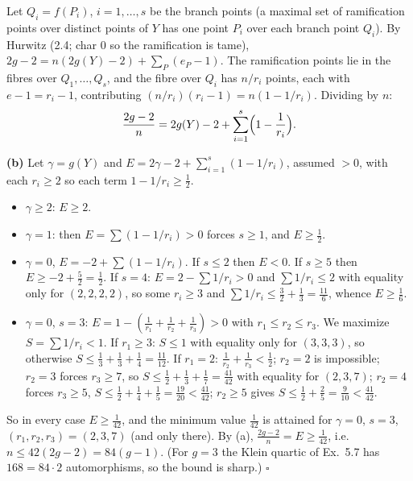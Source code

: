 \documentclass[11pt]{article}
\begin{document}
Let $Q_i=f(P_i)$, $i=1,\dots,s$ be the branch points (a maximal set of ramification points over distinct points of $Y$ has one point $P_i$ over each branch point $Q_i$). By Hurwitz (2.4; char $0$ so the ramification is tame), $2g-2=n(2g(Y)-2)+\sum_P(e_P-1)$. The ramification points lie in the fibres over $Q_1,\dots,Q_s$, and the fibre over $Q_i$ has $n/r_i$ points, each with $e-1=r_i-1$, contributing $(n/r_i)(r_i-1)=n(1-1/r_i)$. Dividing by $n$:
\[
\frac{2g-2}n=2g(Y)-2+\sum_{i=1}^s\Bigl(1-\frac1{r_i}\Bigr).
\]

\textbf{(b)} Let $\gamma=g(Y)$ and $E=2\gamma-2+\sum_{i=1}^s(1-1/r_i)$, assumed $>0$, with each $r_i\ge2$ so each term $1-1/r_i\ge\frac12$.
\begin{itemize}
\item $\gamma\ge2$: $E\ge2$.
\item $\gamma=1$: then $E=\sum(1-1/r_i)>0$ forces $s\ge1$, and $E\ge\frac12$.
\item $\gamma=0$, $E=-2+\sum(1-1/r_i)$. If $s\le2$ then $E<0$. If $s\ge5$ then $E\ge-2+\frac52=\frac12$. If $s=4$: $E=2-\sum1/r_i>0$ and $\sum1/r_i\le2$ with equality only for $(2,2,2,2)$, so some $r_i\ge3$ and $\sum1/r_i\le\frac32+\frac13=\frac{11}6$, whence $E\ge\frac16$.
\item $\gamma=0$, $s=3$: $E=1-(\frac1{r_1}+\frac1{r_2}+\frac1{r_3})>0$ with $r_1\le r_2\le r_3$. We maximize $S=\sum1/r_i<1$. If $r_1\ge3$: $S\le1$ with equality only for $(3,3,3)$, so otherwise $S\le\frac13+\frac13+\frac14=\frac{11}{12}$. If $r_1=2$: $\frac1{r_2}+\frac1{r_3}<\frac12$; $r_2=2$ is impossible; $r_2=3$ forces $r_3\ge7$, so $S\le\frac12+\frac13+\frac17=\frac{41}{42}$ with equality for $(2,3,7)$; $r_2=4$ forces $r_3\ge5$, $S\le\frac12+\frac14+\frac15=\frac{19}{20}<\frac{41}{42}$; $r_2\ge5$ gives $S\le\frac12+\frac25=\frac9{10}<\frac{41}{42}$.
\end{itemize}
So in every case $E\ge\frac1{42}$, and the minimum value $\frac1{42}$ is attained for $\gamma=0$, $s=3$, $(r_1,r_2,r_3)=(2,3,7)$ (and only there). By (a), $\frac{2g-2}n=E\ge\frac1{42}$, i.e.\ $n\le42(2g-2)=84(g-1)$. (For $g=3$ the Klein quartic of Ex.~5.7 has $168=84\cdot2$ automorphisms, so the bound is sharp.) \hfill$\square$
\end{document}
